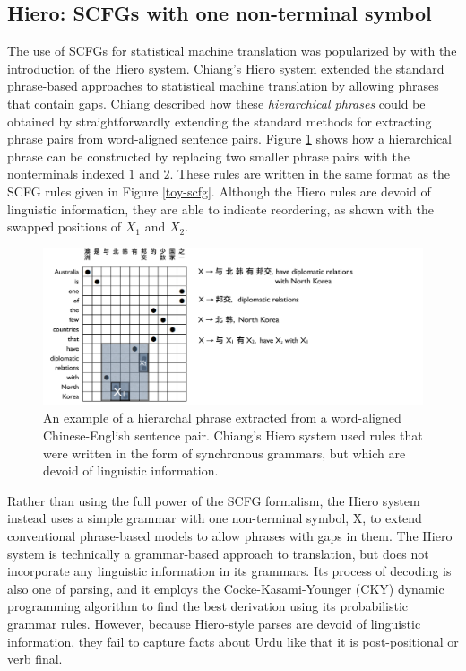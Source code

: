 \subsection{Hiero: SCFGs with one non-terminal symbol}

The use of SCFGs for statistical machine translation was popularized by \citet{Chiang2005} with the introduction of the Hiero system.  Chiang's Hiero system extended the standard phrase-based approaches to statistical machine translation by allowing phrases that contain gaps.  Chiang described how these {\it hierarchical phrases} could be obtained by straightforwardly extending the standard methods \cite{Koehn2004,Koehn2003,Tillmann2003,Venugopal2003} for extracting phrase pairs from word-aligned sentence pairs.  Figure \ref{hiero-phrase-extraction} shows how a hierarchical phrase can be constructed by replacing two smaller phrase pairs with the nonterminals indexed $1$ and $2$.   These rules are written in the same format as the SCFG rules given in Figure \ref{toy-scfg}.  Although the Hiero rules are devoid of linguistic information, they are able to indicate reordering, as shown with the swapped positions of $X_1$ and $X_2$. 

\begin{figure}
\begin{center}
\includegraphics[width=.9\linewidth]{SCFGs/hiero-phrase-extraction.pdf}
\end{center}
\caption{An example of a hierarchal phrase extracted from a word-aligned Chinese-English sentence pair.  Chiang's Hiero system used rules that were written in the form of synchronous grammars, but which are devoid of linguistic information.}\label{hiero-phrase-extraction}
\end{figure}


Rather than using the full power of the SCFG formalism, the Hiero system instead uses a simple grammar with one non-terminal symbol, X, to extend conventional phrase-based models to allow phrases with gaps in them.  The Hiero system is technically a grammar-based approach to translation, but does not incorporate any linguistic information in its grammars.  Its process of decoding is also one of parsing, and it employs the Cocke-Kasami-Younger (CKY) dynamic programming algorithm to find the best derivation using its probabilistic grammar rules.   However, because Hiero-style parses are devoid of linguistic information, they fail to capture facts about Urdu like that it is post-positional or verb final. 

